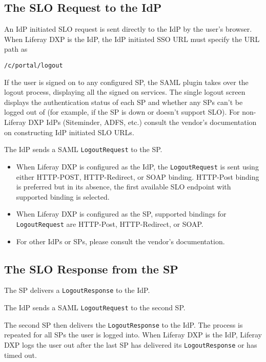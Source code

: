 \subsection{The SLO Request to the
IdP}\label{the-slo-request-to-the-idp}

An IdP initiated SLO request is sent directly to the IdP by the user's
browser. When Liferay DXP is the IdP, the IdP initiated SSO URL must
specify the URL path as

\texttt{/c/portal/logout}

If the user is signed on to any configured SP, the SAML plugin takes
over the logout process, displaying all the signed on services. The
single logout screen displays the authentication status of each SP and
whether any SPs can't be logged out of (for example, if the SP is down
or doesn't support SLO). For non-Liferay DXP IdPs (Siteminder, ADFS,
etc.) consult the vendor's documentation on constructing IdP initiated
SLO URLs.

The IdP sends a SAML \texttt{LogoutRequest} to the SP.

\begin{itemize}
\tightlist
\item
  When Liferay DXP is configured as the IdP, the \texttt{LogoutRequest}
  is sent using either HTTP-POST, HTTP-Redirect, or SOAP binding.
  HTTP-Post binding is preferred but in its absence, the first available
  SLO endpoint with supported binding is selected.
\item
  When Liferay DXP is configured as the SP, supported bindings for
  \texttt{LogoutRequest} are HTTP-Post, HTTP-Redirect, or SOAP.
\item
  For other IdPs or SPs, please consult the vendor's documentation.
\end{itemize}

\subsection{The SLO Response from the
SP}\label{the-slo-response-from-the-sp}

The SP delivers a \texttt{LogoutResponse} to the IdP.

The IdP sends a SAML \texttt{LogoutRequest} to the second SP.

The second SP then delivers the \texttt{LogoutResponse} to the IdP. The
process is repeated for all SPs the user is logged into. When Liferay
DXP is the IdP, Liferay DXP logs the user out after the last SP has
delivered its \texttt{LogoutResponse} or has timed out.

